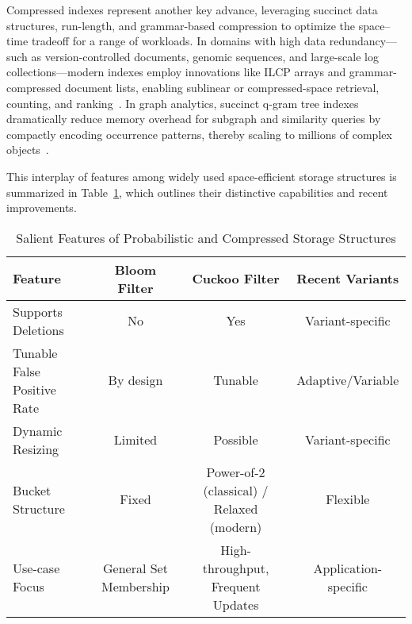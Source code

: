 \documentclass[11pt]{article}
\begin{document}

\vspace{3mm}

Compressed indexes represent another key advance, leveraging succinct data structures, run-length, and grammar-based compression to optimize the space--time tradeoff for a range of workloads. In domains with high data redundancy—such as version-controlled documents, genomic sequences, and large-scale log collections—modern indexes employ innovations like ILCP arrays and grammar-compressed document lists, enabling sublinear or compressed-space retrieval, counting, and ranking~\cite{ref87, ref106, ref108}. In graph analytics, succinct q-gram tree indexes dramatically reduce memory overhead for subgraph and similarity queries by compactly encoding occurrence patterns, thereby scaling to millions of complex objects~\cite{ref109}.

This interplay of features among widely used space-efficient storage structures is summarized in Table~\ref{tab:filter_comparison}, which outlines their distinctive capabilities and recent improvements.

\begin{table}[ht]
\centering
\caption{Salient Features of Probabilistic and Compressed Storage Structures}
\label{tab:filter_comparison}
\begin{tabular}{lccc}
\toprule
Feature & Bloom Filter & Cuckoo Filter & Recent Variants \\
\midrule
Supports Deletions & No & Yes & Variant-specific \\
Tunable False Positive Rate & By design & Tunable & Adaptive/Variable \\
Dynamic Resizing & Limited & Possible & Variant-specific \\
Bucket Structure & Fixed & Power-of-2 (classical) / Relaxed (modern) & Flexible \\
Use-case Focus & General Set Membership & High-throughput, Frequent Updates & Application-specific \\
\bottomrule
\end{tabular}
\end{table}
\end{document}
